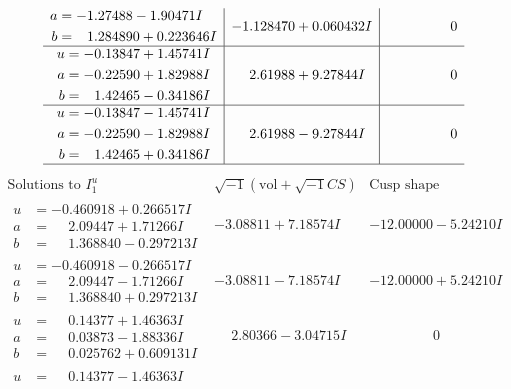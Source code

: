 \documentclass[1p]{elsarticle_modified}
\theoremstyle{definition}
\newcommand{\I}{\sqrt{-1}}
\begin{document}
$$\begin{array}{c|c|c}
\begin{aligned}
a &= -1.27488 - 1.90471 I \\
b &= \phantom{-}1.284890 + 0.223646 I\end{aligned}
 & -1.128470 + 0.060432 I & \phantom{-0.000000 } 0 \\ \hline\begin{aligned}
u &= -0.13847 + 1.45741 I \\
a &= -0.22590 + 1.82988 I \\
b &= \phantom{-}1.42465 - 0.34186 I\end{aligned}
 & \phantom{-}2.61988 + 9.27844 I & \phantom{-0.000000 } 0 \\ \hline\begin{aligned}
u &= -0.13847 - 1.45741 I \\
a &= -0.22590 - 1.82988 I \\
b &= \phantom{-}1.42465 + 0.34186 I\end{aligned}
 & \phantom{-}2.61988 - 9.27844 I & \phantom{-0.000000 } 0\\
 \hline 
 \end{array}$$\newpage$$\begin{array}{c|c|c}  
\text{Solutions to }I^u_{1}& \I (\text{vol} + \sqrt{-1}CS) & \text{Cusp shape}\\
 \hline 
\begin{aligned}
u &= -0.460918 + 0.266517 I \\
a &= \phantom{-}2.09447 + 1.71266 I \\
b &= \phantom{-}1.368840 - 0.297213 I\end{aligned}
 & -3.08811 + 7.18574 I & -12.00000 - 5.24210 I \\ \hline\begin{aligned}
u &= -0.460918 - 0.266517 I \\
a &= \phantom{-}2.09447 - 1.71266 I \\
b &= \phantom{-}1.368840 + 0.297213 I\end{aligned}
 & -3.08811 - 7.18574 I & -12.00000 + 5.24210 I \\ \hline\begin{aligned}
u &= \phantom{-}0.14377 + 1.46363 I \\
a &= \phantom{-}0.03873 - 1.88336 I \\
b &= \phantom{-}0.025762 + 0.609131 I\end{aligned}
 & \phantom{-}2.80366 - 3.04715 I & \phantom{-0.000000 } 0 \\ \hline\begin{aligned}
u &= \phantom{-}0.14377 - 1.46363 I \\

\end{aligned}
\end{array}$$
\end{document}
